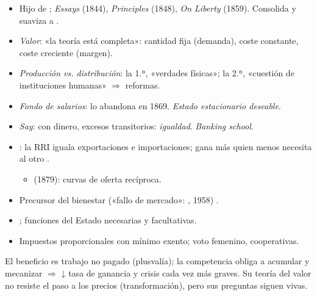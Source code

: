 \documentclass{article}
\begin{document}
\begin{columnas}
\begin{itemize}
\item Hijo de ; \emph{Essays} (1844), \emph{Principles} (1848), \emph{On Liberty} (1859). Consolida y suaviza a .
\end{itemize}
\begin{itemize}
\item \emph{Valor}: «la teoría está completa»: cantidad fija (demanda), coste constante, coste creciente (margen).
\item \emph{Producción vs. distribución}: la 1.ª, «verdades físicas»; la 2.ª, «cuestión de instituciones humanas» $\Rightarrow$ reformas.
\item \emph{Fondo de salarios}: lo abandona en 1869. \emph{Estado estacionario deseable}.
\item \emph{Say}: con dinero, excesos transitorios: \emph{igualdad}. \emph{Banking school}.
\item {}: la RRI iguala exportaciones e importaciones; gana más quien menos necesita al otro .
  \begin{itemize}
  \item {} (1879): curvas de oferta recíproca.
  \end{itemize}
\item Precursor del bienestar («fallo de mercado»: , 1958) .
\end{itemize}
\begin{itemize}
\item {} ; funciones del Estado necesarias y facultativas.
\item Impuestos proporcionales con mínimo exento; voto femenino, cooperativas.
\end{itemize}

\begin{ideaclave}
El beneficio es trabajo no pagado (plusvalía); la competencia obliga a acumular y mecanizar $\Rightarrow$ ↓ tasa de ganancia y crisis cada vez más graves. Su teoría del valor no resiste el paso a los precios (transformación), pero sus preguntas siguen vivas.
\end{ideaclave}


\end{columnas}
\end{document}

